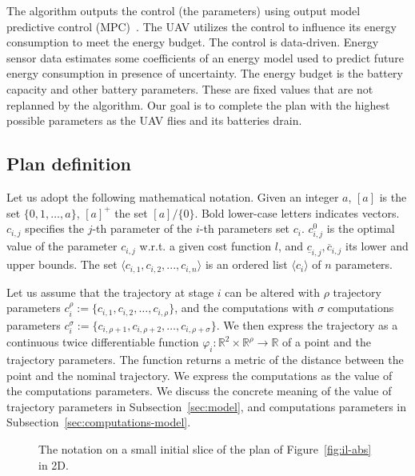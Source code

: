 \documentclass[letterpaper,10pt,conference]{ieeeconf}
\newcommand{\figpath}{./figures}
\theoremstyle{definition}
\begin{document}
The algorithm outputs the control (the parameters) using output model predictive control (MPC)~\cite{rawlings2017model}. The UAV utilizes the control to influence its energy consumption to meet the energy budget. The control is data-driven. Energy sensor data estimates some coefficients of an energy model used to predict future energy consumption in presence of uncertainty. The energy budget is the battery capacity and other battery parameters. These are fixed values that are not replanned by the algorithm. Our goal is to complete the plan with the highest possible parameters as the UAV flies and its batteries drain. 

\subsection{Plan definition}
\label{sec:prelim}

Let us adopt the following mathematical notation. Given an integer $a$, $[a]$ is the set $\{0,1,\dots,a\}$, $[a]^+$ the set $[a]/\{0\}$. Bold lower-case letters indicates vectors. $c_{i,j}$ specifies the $j$-th parameter of the $i$-th parameters set $c_i$. $c_{i,j}^0$ is the optimal value of the parameter $c_{i,j}$ w.r.t. a given cost function $l$, and $\underline{c}_{i,j},\overline{c}_{i,j}$ its lower and upper bounds. The set $\langle c_{i,1},c_{i,2},...,c_{i,n}\rangle$ is an ordered list $\langle c_i \rangle$ of $n$ parameters.

Let us assume that the trajectory at stage $i$ can be altered with $\rho$ trajectory parameters $c_i^\rho:=\{c_{i,1},c_{i,2},\dots,c_{i,\rho}\}$, and the computations with $\sigma$ computations parameters $c_i^\sigma:=\{c_{i,\rho+1},c_{i,\rho+2},\dots,c_{i,\rho+\sigma}\}$. We then express the trajectory as a continuous twice differentiable function $\varphi_i:\mathbb{R}^2\times\mathbb{R}^\rho\rightarrow\mathbb{R}$ of a point and the trajectory parameters. The function returns a metric of the distance between the point and the nominal trajectory. We express the computations as the value of the computations parameters. We discuss the concrete meaning of the value of trajectory parameters in Subsection~\ref{sec:model}, and computations parameters in Subsection~\ref{sec:computations-model}.

\begin{figure}[h]
  \centering
  
  \caption{The notation on a small initial slice of the plan of Figure~\ref{fig:il-abs} in 2D.}
  \label{fig:traj1}
\end{figure}
\end{document}
